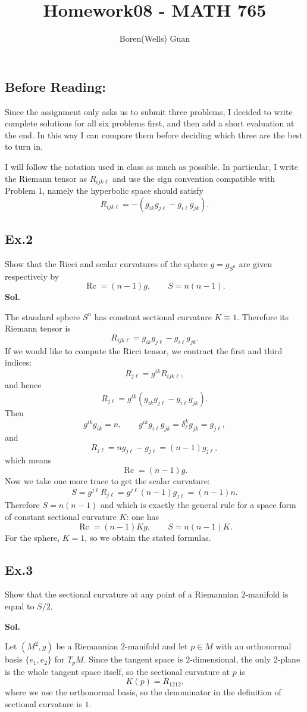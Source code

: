 \documentclass[lang=en,11pt,a4paper,citestyle =authoryear]{elegantpaper}
\title{Homework08 - MATH 765}
\author{Boren(Wells) Guan}
\newcommand{\Rc}{\operatorname{Rc}}
\begin{document}
\maketitle

\subsection*{Before Reading:}\par
Since the assignment only asks us to submit three problems, I decided to write complete solutions for all six problems first, and then add a short evaluation at the end. In this way I can compare them before deciding which three are the best to turn in.\par
I will follow the notation used in class as much as possible. In particular, I write the Riemann tensor as $R_{ijk\ell}$ and use the sign convention compatible with Problem 1, namely the hyperbolic space should satisfy
\[
R_{ijk\ell}=-(g_{ik}g_{j\ell}-g_{i\ell}g_{jk}).
\]
\subsection*{Ex.2}
Show that the Ricci and scalar curvatures of the sphere $g=g_{S^n}$ are given respectively by
\[
\Rc=(n-1)g,
\qquad
S=n(n-1).
\]
\textbf{Sol.} \par
The standard sphere $S^n$ has constant sectional curvature $K\equiv 1$. Therefore its Riemann tensor is
\[
R_{ijk\ell}=g_{ik}g_{j\ell}-g_{i\ell}g_{jk}.
\]
If we would like to compute the Ricci tensor, we contract the first and third indices:
\[
R_{j\ell}=g^{ik}R_{ijk\ell},
\]
and hence
\[
R_{j\ell}=g^{ik}(g_{ik}g_{j\ell}-g_{i\ell}g_{jk}).
\]
Then
\[
g^{ik}g_{ik}=n,
\qquad
g^{ik}g_{i\ell}g_{jk}=\delta^k_{\ell}g_{jk}=g_{j\ell},
\]
and
\[
R_{j\ell}=ng_{j\ell}-g_{j\ell}=(n-1)g_{j\ell},
\]
which means
\[
\Rc=(n-1)g.
\]
Now we take one more trace to get the scalar curvature:
\[
S=g^{j\ell}R_{j\ell}=g^{j\ell}(n-1)g_{j\ell}=(n-1)n.
\]
Therefore $S=n(n-1)$ and which is exactly the general rule for a space form of constant sectional curvature $K$: one has
\[
\Rc=(n-1)Kg,
\qquad
S=n(n-1)K.
\]
For the sphere, $K=1$, so we obtain the stated formulas.\par

\subsection*{Ex.3}
Show that the sectional curvature at any point of a Riemannian $2$-manifold is equal to $S/2$.\par
\textbf{Sol.} \par
Let $(M^2,g)$ be a Riemannian $2$-manifold and let $p\in M$ with an orthonormal basis $\{e_1,e_2\}$ for $T_pM$. Since the tangent space is $2$-dimensional, the only $2$-plane is the whole tangent space itself, so the sectional curvature at $p$ is
\[
K(p)=R_{1212}.
\]
where we use the orthonormal basis, so the denominator in the definition of sectional curvature is $1$.
\end{document}
